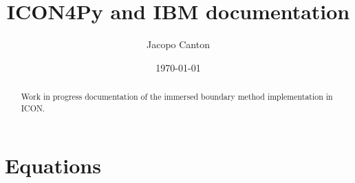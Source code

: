 \documentclass[fleqn]{article}
\title{ICON4Py and IBM documentation}
\author{Jacopo Canton}
\date{\today}
\begin{document}
\maketitle

\begin{abstract}
Work in progress documentation of the immersed boundary method implementation in ICON.
\end{abstract}

\section{Equations}











\end{document}
